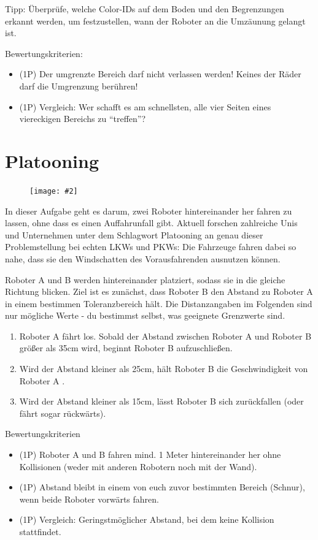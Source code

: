 \documentclass[
	12pt,
	colorbacktitle,
	accentcolor=tud1c,
	draft,
	twoside,
	german
]{tudexercise}
\newcommand{\easygcenter}[2]{
	\begin{figure}[h]
	\centering 
	\texttt{[image: \#2]}
	\end{figure}
}
\begin{document}
	Tipp: Überprüfe, welche Color-IDs auf dem Boden und den Begrenzungen erkannt werden, um festzustellen, wann der Roboter an die Umzäunung gelangt ist.
	
	Bewertungskriterien:
	\begin{itemize}
	\item (1P) Der umgrenzte Bereich darf nicht verlassen werden! Keines der Räder darf die Umgrenzung berühren!
	\item (1P) Vergleich: Wer schafft es am schnellsten, alle vier Seiten eines viereckigen Bereichs zu “treffen”?
	\end{itemize}
	
	\newpage
	\section{Platooning}
	\easygcenter{.8\textwidth}{img/task_platooning.jpg}
	In dieser Aufgabe geht es darum, zwei Roboter hintereinander her fahren zu lassen, ohne dass es einen Auffahrunfall gibt. Aktuell forschen zahlreiche Unis und Unternehmen unter dem Schlagwort Platooning an genau dieser Problemstellung bei echten LKWs und PKWs: Die Fahrzeuge fahren dabei so nahe, dass sie den Windschatten des Vorausfahrenden ausnutzen können.
	
	Roboter A und B werden hintereinander platziert, sodass sie in die gleiche Richtung blicken. Ziel ist es zunächst, dass Roboter B den Abstand zu Roboter A in einem bestimmen Toleranzbereich hält. Die Distanzangaben im Folgenden sind nur mögliche Werte - du bestimmst selbst, was geeignete Grenzwerte sind.
	\begin{enumerate}
	\item Roboter A fährt los. Sobald der Abstand zwischen Roboter A und Roboter B größer als 35cm wird, beginnt Roboter B aufzuschließen.
	\item Wird der Abstand kleiner als 25cm, hält Roboter B die Geschwindigkeit von Roboter A .
	\item Wird der Abstand kleiner als 15cm, lässt Roboter B sich zurückfallen (oder fährt sogar rückwärts).
	\end{enumerate}
	Bewertungskriterien
	\begin{itemize}
	\item (1P) Roboter A und B fahren mind. 1 Meter hintereinander her ohne Kollisionen (weder mit anderen Robotern noch mit der Wand).
	\item (1P) Abstand bleibt in einem von euch zuvor bestimmten Bereich (Schnur), wenn beide Roboter vorwärts fahren.
	\item (1P) Vergleich: Geringstmöglicher Abstand, bei dem keine Kollision stattfindet.
	\end{itemize}
	
\end{document}
